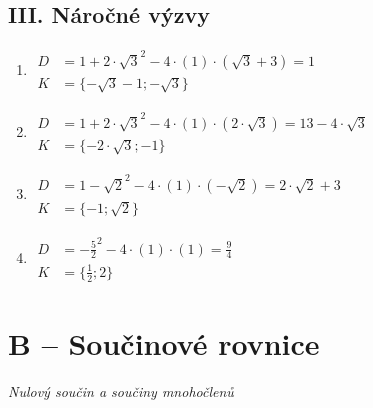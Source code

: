 \documentclass[11pt,a4paper]{article}
\begin{document}
\subsection*{III. Náročné výzvy}
\begin{enumerate}[label={},itemsep=9pt]
\item[\textbf{A007}] \(\displaystyle \begin{aligned}D&=1 + 2 \cdot \sqrt{3}^2-4\cdot(1)\cdot(\sqrt{3} + 3)=1\\K&=\{- \sqrt{3} - 1;- \sqrt{3}\}\end{aligned}\)\par
\item[\textbf{A008}] \(\displaystyle \begin{aligned}D&=1 + 2 \cdot \sqrt{3}^2-4\cdot(1)\cdot(2 \cdot \sqrt{3})=13 - 4 \cdot \sqrt{3}\\K&=\{- 2 \cdot \sqrt{3};-1\}\end{aligned}\)\par
\item[\textbf{A009}] \(\displaystyle \begin{aligned}D&=1 - \sqrt{2}^2-4\cdot(1)\cdot(- \sqrt{2})=2 \cdot \sqrt{2} + 3\\K&=\{-1;\sqrt{2}\}\end{aligned}\)\par
\item[\textbf{A010}] \(\displaystyle \begin{aligned}D&=- \frac{5}{2}^2-4\cdot(1)\cdot(1)=\frac{9}{4}\\K&=\{\frac{1}{2};2\}\end{aligned}\)\par
\end{enumerate}
\section*{B -- Součinové rovnice}
\textit{Nulový součin a součiny mnohočlenů}
\end{document}
